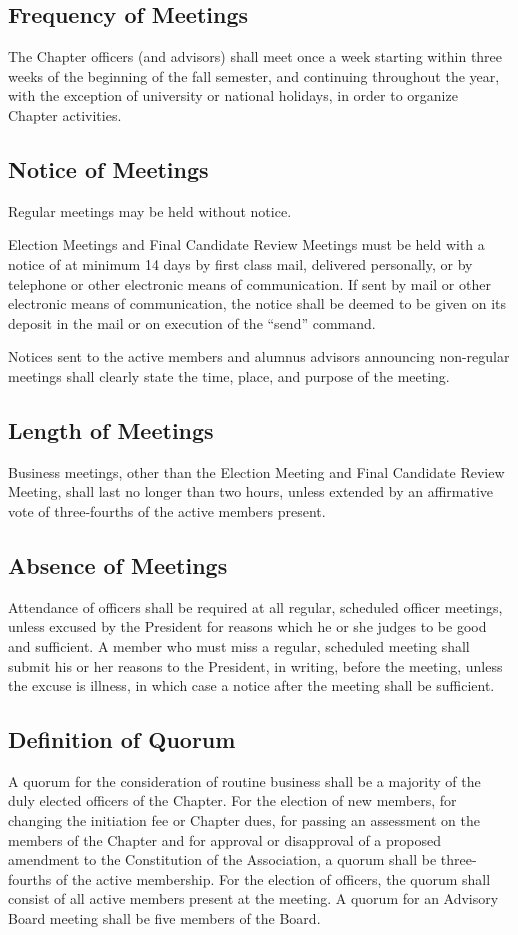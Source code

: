 \documentclass{article}
\begin{document}
	\subsection{Frequency of Meetings}	
	The Chapter officers (and advisors) shall meet once a week starting within three weeks of the beginning of the fall semester, and continuing throughout the year, with the exception of university or national holidays, in order to organize Chapter activities.
	\subsection{Notice of Meetings}
	Regular meetings may be held without notice.
	
	Election Meetings and Final Candidate Review Meetings must be held with a notice of at minimum 14 days by first class mail, delivered personally, or by telephone or other electronic means of communication.  If sent by mail or other electronic means of communication, the notice shall be deemed to be given on its deposit in the mail or on execution of the ``send'' command.
	
	Notices sent to the active members and alumnus advisors announcing non-regular meetings shall clearly state the time, place, and purpose of the meeting.
	
	\subsection{Length of Meetings}
	Business meetings, other than the Election Meeting and Final Candidate Review Meeting, shall last no longer than two hours, unless extended by an affirmative vote of three-fourths of the active members present.
	\subsection{Absence of Meetings}
	Attendance of officers shall be required at all regular, scheduled officer meetings, unless excused by the President for reasons which he or she judges to be good and sufficient. A member who must miss a regular, scheduled meeting shall submit his or her reasons to the President, in writing, before the meeting, unless the excuse is illness, in which case a notice after the meeting shall be sufficient.
	\subsection{Definition of Quorum}
	A quorum for the consideration of routine business shall be a majority of the duly elected officers of the Chapter. For the election of new members, for changing the initiation fee or Chapter dues, for passing an assessment on the members of the Chapter and for approval or disapproval of a proposed amendment to the Constitution of the Association, a quorum shall be three-fourths of the active membership. For the election of officers, the quorum shall consist of all active members present at the meeting. A quorum for an Advisory Board meeting shall be five members of the Board.
\end{document}
